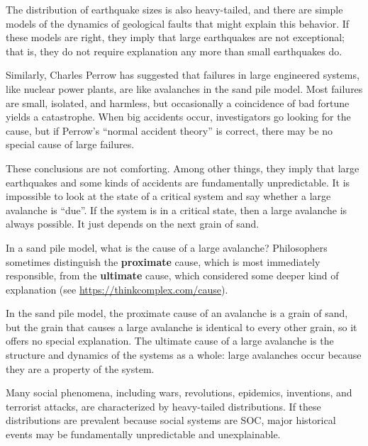 \documentclass[12pt]{book}
\theoremstyle{exercise}
\begin{document}
The distribution of earthquake sizes is also heavy-tailed,
and there are simple models of the dynamics of geological faults
that might explain this behavior.  If these models are right,
they imply that large earthquakes are not exceptional; that is,
they do not require explanation any more than small earthquakes do.


Similarly, Charles Perrow has suggested that failures in large
engineered systems, like nuclear power plants, are like avalanches
in the sand pile model.  Most failures are small, isolated, and
harmless, but occasionally a coincidence of bad fortune yields a
catastrophe.  When big accidents occur, investigators go looking for
the cause, but if Perrow's ``normal accident theory'' is correct,
there may be no special cause of large failures.


These conclusions are not comforting.  Among other things, they
imply that large earthquakes and some kinds of accidents are
fundamentally unpredictable.  It is impossible to look at the
state of a critical system and say whether a large avalanche
is ``due''.  If the system is in a critical state, then a large
avalanche is always possible.  It just depends on the
next grain of sand.

In a sand pile model, what is the cause of a large avalanche?
Philosophers sometimes distinguish the {\bf proximate} cause, which is
most immediately responsible, from the {\bf ultimate} cause, which considered some deeper kind of explanation (see \url{https://thinkcomplex.com/cause}).


In the sand pile model, the proximate cause of an avalanche is
a grain of sand, but the grain that causes a large avalanche
is identical to every other grain, so it offers no special explanation.
The ultimate cause of a large avalanche is the structure and
dynamics of the systems as a whole: large avalanches occur because
they are a property of the system.


Many social phenomena, including wars, revolutions, epidemics,
inventions, and terrorist attacks, are characterized by heavy-tailed
distributions.  If these distributions are prevalent because social systems are SOC, major historical events may be fundamentally unpredictable and unexplainable.
\end{document}
